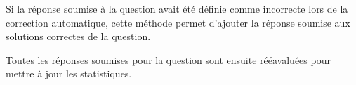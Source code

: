 \documentclass[a4,10pt,french]{sphinxmanual}
\begin{document}
\begin{fulllineitems}
\begin{fulllineitems}
\end{fulllineitems}


\begin{fulllineitems}
\label{database:quiz.models.SqSubmit.set_as_correct}
Si la réponse soumise à la question avait été définie comme incorrecte
lors de la correction automatique, cette méthode permet d'ajouter la réponse
soumise aux solutions correctes de la question.

Toutes les réponses soumises pour la question sont ensuite rééavaluées pour
mettre à jour les statistiques.

\end{fulllineitems}


\end{fulllineitems}

\end{document}
